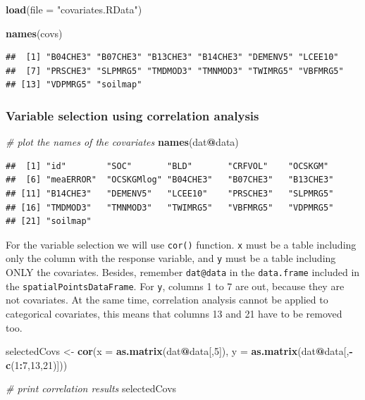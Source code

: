 \documentclass[10pt,b5paper,]{book}
\newenvironment{Shaded}{\begin{snugshade}}{\end{snugshade}}
\newcommand{\CommentTok}[1]{\textcolor[rgb]{0.56,0.35,0.01}{\textit{#1}}}
\newcommand{\DataTypeTok}[1]{\textcolor[rgb]{0.13,0.29,0.53}{#1}}
\newcommand{\DecValTok}[1]{\textcolor[rgb]{0.00,0.00,0.81}{#1}}
\newcommand{\KeywordTok}[1]{\textcolor[rgb]{0.13,0.29,0.53}{\textbf{#1}}}
\newcommand{\NormalTok}[1]{#1}
\newcommand{\OperatorTok}[1]{\textcolor[rgb]{0.81,0.36,0.00}{\textbf{#1}}}
\newcommand{\StringTok}[1]{\textcolor[rgb]{0.31,0.60,0.02}{#1}}
\theoremstyle{definition}
\theoremstyle{definition}
\theoremstyle{definition}
\theoremstyle{remark}
\begin{document}
\begin{Shaded}
\begin{Highlighting}[]
\KeywordTok{load}\NormalTok{(}\DataTypeTok{file =} \StringTok{"covariates.RData"}\NormalTok{)}

\KeywordTok{names}\NormalTok{(covs)}
\end{Highlighting}
\end{Shaded}

\begin{verbatim}
##  [1] "B04CHE3" "B07CHE3" "B13CHE3" "B14CHE3" "DEMENV5" "LCEE10" 
##  [7] "PRSCHE3" "SLPMRG5" "TMDMOD3" "TMNMOD3" "TWIMRG5" "VBFMRG5"
## [13] "VDPMRG5" "soilmap"
\end{verbatim}

\hypertarget{variable-selection-using-correlation-analysis}{%
\subsubsection{Variable selection using correlation
analysis}\label{variable-selection-using-correlation-analysis}}

\begin{Shaded}
\begin{Highlighting}[]
\CommentTok{# plot the names of the covariates}
\KeywordTok{names}\NormalTok{(dat}\OperatorTok{@}\NormalTok{data)}
\end{Highlighting}
\end{Shaded}

\begin{verbatim}
##  [1] "id"        "SOC"       "BLD"       "CRFVOL"    "OCSKGM"   
##  [6] "meaERROR"  "OCSKGMlog" "B04CHE3"   "B07CHE3"   "B13CHE3"  
## [11] "B14CHE3"   "DEMENV5"   "LCEE10"    "PRSCHE3"   "SLPMRG5"  
## [16] "TMDMOD3"   "TMNMOD3"   "TWIMRG5"   "VBFMRG5"   "VDPMRG5"  
## [21] "soilmap"
\end{verbatim}

For the variable selection we will use \texttt{cor()} function.
\texttt{x} must be a table including only the column with the response
variable, and \texttt{y} must be a table including ONLY the covariates.
Besides, remember \texttt{dat@data} in the \texttt{data.frame} included
in the \texttt{spatialPointsDataFrame}. For \texttt{y}, columns 1 to 7
are out, because they are not covariates. At the same time, correlation
analysis cannot be applied to categorical covariates, this means that
columns 13 and 21 have to be removed too.

\begin{Shaded}
\begin{Highlighting}[]
\NormalTok{selectedCovs <-}\StringTok{ }\KeywordTok{cor}\NormalTok{(}\DataTypeTok{x =} \KeywordTok{as.matrix}\NormalTok{(dat}\OperatorTok{@}\NormalTok{data[,}\DecValTok{5}\NormalTok{]),}
           \DataTypeTok{y =} \KeywordTok{as.matrix}\NormalTok{(dat}\OperatorTok{@}\NormalTok{data[,}\OperatorTok{-}\KeywordTok{c}\NormalTok{(}\DecValTok{1}\OperatorTok{:}\DecValTok{7}\NormalTok{,}\DecValTok{13}\NormalTok{,}\DecValTok{21}\NormalTok{)]))}

\CommentTok{# print correlation results}
\NormalTok{selectedCovs}
\end{Highlighting}
\end{Shaded}
\end{document}
